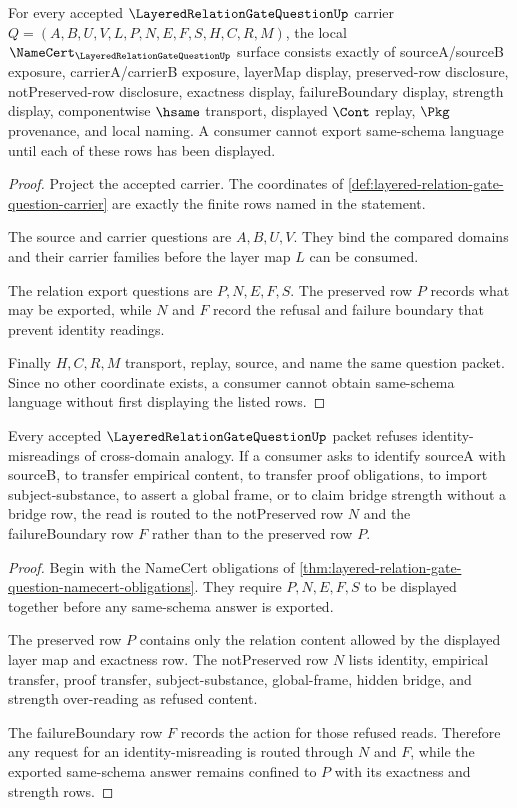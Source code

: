 \begin{theorem}
\label{thm:layered-relation-gate-question-namecert-obligations}
For every accepted $\LayeredRelationGateQuestionUp$ carrier $Q=(A,B,U,V,L,P,N,E,F,S,H,C,R,M)$, the local $\NameCert_{\LayeredRelationGateQuestionUp}$ surface consists exactly of sourceA/sourceB exposure, carrierA/carrierB exposure, layerMap display, preserved-row disclosure, notPreserved-row disclosure, exactness display, failureBoundary display, strength display, componentwise $\hsame$ transport, displayed $\Cont$ replay, $\Pkg$ provenance, and local naming. A consumer cannot export same-schema language until each of these rows has been displayed.
\end{theorem}
\begin{proof}
Project the accepted carrier. The coordinates of \autoref{def:layered-relation-gate-question-carrier} are exactly the finite rows named in the statement.

The source and carrier questions are $A,B,U,V$. They bind the compared domains and their carrier families before the layer map $L$ can be consumed.

The relation export questions are $P,N,E,F,S$. The preserved row $P$ records what may be exported, while $N$ and $F$ record the refusal and failure boundary that prevent identity readings.

Finally $H,C,R,M$ transport, replay, source, and name the same question packet. Since no other coordinate exists, a consumer cannot obtain same-schema language without first displaying the listed rows.
\end{proof}

\begin{theorem}
\label{thm:layered-relation-gate-question-refusal-surface}
Every accepted $\LayeredRelationGateQuestionUp$ packet refuses identity-misreadings of cross-domain analogy. If a consumer asks to identify sourceA with sourceB, to transfer empirical content, to transfer proof obligations, to import subject-substance, to assert a global frame, or to claim bridge strength without a bridge row, the read is routed to the notPreserved row $N$ and the failureBoundary row $F$ rather than to the preserved row $P$.
\end{theorem}
\begin{proof}
Begin with the NameCert obligations of \autoref{thm:layered-relation-gate-question-namecert-obligations}. They require $P,N,E,F,S$ to be displayed together before any same-schema answer is exported.

The preserved row $P$ contains only the relation content allowed by the displayed layer map and exactness row. The notPreserved row $N$ lists identity, empirical transfer, proof transfer, subject-substance, global-frame, hidden bridge, and strength over-reading as refused content.

The failureBoundary row $F$ records the action for those refused reads. Therefore any request for an identity-misreading is routed through $N$ and $F$, while the exported same-schema answer remains confined to $P$ with its exactness and strength rows.
\end{proof}

